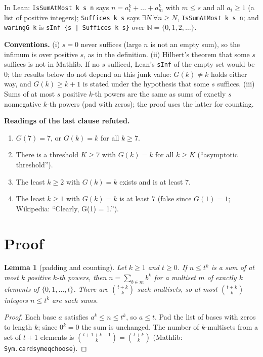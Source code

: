 \documentclass[11pt]{article}
\renewcommand{\_}{\oldus\allowbreak}
\newtheorem{lemma}[theorem]{Lemma}
\theoremstyle{definition}
\newcommand{\N}{\mathbb{N}}
\begin{document}
In Lean: \texttt{IsSumAtMost k s n} says $n = a_1^k + \dots + a_m^k$ with $m \le s$ and all $a_i \ge 1$
(a list of positive integers); \texttt{Suffices k s} says $\exists N\ \forall n \ge N$,
\texttt{IsSumAtMost k s n}; and \texttt{waringG k} is \texttt{sInf \{s | Suffices k s\}} over $\N =
\{0,1,2,\dots\}$.

\textbf{Conventions.} (i) $s = 0$ never suffices (large $n$ is not an empty sum), so the infimum is
over positive $s$, as in the definition. (ii) Hilbert's theorem that some $s$ suffices is not in
Mathlib. If no $s$ sufficed, Lean's \texttt{sInf} of the empty set would be $0$; the results below do not
depend on this junk value: $G(k) \ne k$ holds either way, and $G(k) \ge k+1$ is stated under the
hypothesis that some $s$ suffices. (iii) Sums of at most $s$ positive $k$-th powers are the same as sums
of exactly $s$ nonnegative $k$-th powers (pad with zeros); the proof uses the latter for counting.

\textbf{Readings of the last clause refuted.}
\begin{enumerate}[label=(R\arabic*)]
\item $G(7) = 7$, or $G(k) = k$ for all $k \ge 7$.
\item There is a threshold $K \ge 7$ with $G(k) = k$ for all $k \ge K$ (``asymptotic threshold'').
\item The least $k \ge 2$ with $G(k) = k$ exists and is at least $7$.
\item The least $k \ge 1$ with $G(k) = k$ is at least $7$ (false since $G(1) = 1$; Wikipedia:
``Clearly, G(1) = 1.'').
\end{enumerate}

\section{Proof}

\begin{lemma}[padding and counting]\label{lem:count}
Let $k \ge 1$ and $t \ge 0$. If $n \le t^k$ is a sum of at most $k$ positive $k$-th powers, then
$n = \sum_{b \in m} b^k$ for a multiset $m$ of exactly $k$ elements of $\{0, 1, \dots, t\}$. There are
$\binom{t+k}{k}$ such multisets, so at most $\binom{t+k}{k}$ integers $n \le t^k$ are such sums.
\end{lemma}
\begin{proof}
Each base $a$ satisfies $a^k \le n \le t^k$, so $a \le t$. Pad the list of bases with zeros to length
$k$; since $0^k = 0$ the sum is unchanged. The number of $k$-multisets from a set of $t+1$ elements is
$\binom{t+1+k-1}{k} = \binom{t+k}{k}$ (Mathlib: \texttt{Sym.card\_sym\_eq\_choose}).
\end{proof}
\end{document}
